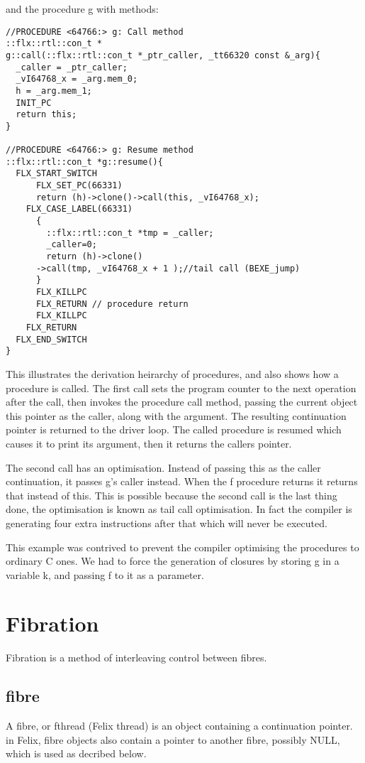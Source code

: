 \documentclass[oneside]{book}
\begin{document}
and the procedure g with methods:
\begin{verbatim}
//PROCEDURE <64766:> g: Call method
::flx::rtl::con_t * 
g::call(::flx::rtl::con_t *_ptr_caller, _tt66320 const &_arg){
  _caller = _ptr_caller;
  _vI64768_x = _arg.mem_0;
  h = _arg.mem_1;
  INIT_PC
  return this;
}

//PROCEDURE <64766:> g: Resume method
::flx::rtl::con_t *g::resume(){
  FLX_START_SWITCH
      FLX_SET_PC(66331)
      return (h)->clone()->call(this, _vI64768_x);
    FLX_CASE_LABEL(66331)
      {
        ::flx::rtl::con_t *tmp = _caller;
        _caller=0;
        return (h)->clone()
      ->call(tmp, _vI64768_x + 1 );//tail call (BEXE_jump)
      }
      FLX_KILLPC
      FLX_RETURN // procedure return
      FLX_KILLPC
    FLX_RETURN
  FLX_END_SWITCH
}
\end{verbatim}

This illustrates the derivation heirarchy of procedures, and also 
shows how a procedure is called. The first call sets the program
counter to the next operation after the call, then invokes the procedure
call method, passing the current object this pointer as the caller,
along with the argument. The resulting continuation pointer is returned
to the driver loop. The called procedure is resumed which causes it
to print its argument, then it returns the callers pointer.

The second call has an optimisation. Instead of passing this as the
caller continuation, it passes g's caller instead. When the f
procedure returns it returns that instead of this. This is possible
because the second call is the last thing done, the optimisation
is known as tail call optimisation. In fact the compiler is generating
four extra instructions after that which will never be executed.

This example was contrived to prevent the compiler optimising
the procedures to ordinary C ones. We had to force the generation
of closures by storing g in a variable k, and passing f to it
as a parameter.

\section{Fibration}
Fibration is a method of interleaving control between fibres.

\subsection{fibre}
A fibre, or fthread (Felix thread) is an object containing a continuation pointer.
in Felix, fibre objects also contain a pointer to another fibre, possibly NULL,
which is used as decribed below.
\end{document}
